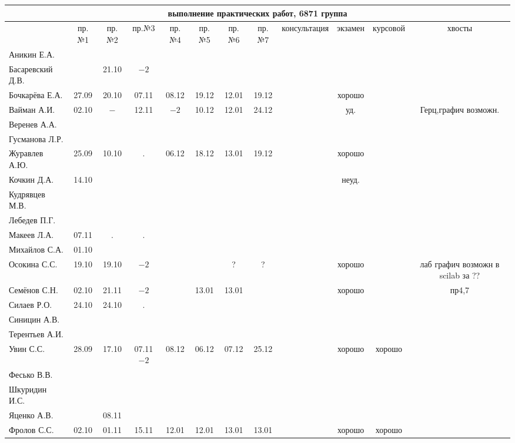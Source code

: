 \documentclass[a4paper,landscape,11pt]{article}
\newcommand*\ok{&{\small \ding{51}}} %
\begin{document}
\begin{tabular}{l|ccccccccccc}
\multicolumn{12}{c}{выполнение практических работ, 6871 группа} \\
\toprule
		        &пр.№1&пр.№2&пр.№3&пр.№4&пр.№5&пр.№6&пр.№7&консультация&экзамен&курсовой&хвосты\\
\midrule
	Аникин Е.А.     &     &     &     &     &     &&&&&\\    
	Басаревский Д.В.&     &21.10& $-2$&     &     &     &     \ok{\small\ding{51}}&&\\
	Бочкарёва Е.А.  &27.09&20.10&07.11&08.12&19.12&12.01&19.12\ok&хорошо&&\\
	Вайман А.И.     &02.10&$-$  &12.11& $-2$&10.12&12.01&24.12\ok&уд.&&Герц,графич возможн.\\
	Веренев А.А.    &     &     &     &     &           &&&&&\\
	Гусманова Л.Р.  &     &     &     &     &     &&&&&\\
	Журавлев А.Ю.   &25.09&10.10&  .  &06.12&18.12&13.01&19.12\ok&хорошо&&\\
	Кочкин Д.А.     &14.10&     &     &     &     &     &     \ok&неуд.&&\\
	Кудрявцев М.В.  &     &     &     &     &     &&&&&\\
	Лебедев П.Г.    &     &     &     &     &     &&&&&\\
	Макеев Л.А.     &07.11&  .  &  .  &     &     &&&&&\\
	Михайлов С.А.   &01.10&     &     &     &     &     &     \ok&&&\\
	Осокина С.С.    &19.10&19.10&$-2$ &     &     &?    &?    \ok{\small\ding{51}}&хорошо&&лаб графич возможн в scilab за ??\\
	Семёнов С.Н.    &02.10&21.11&$-2 $&     &13.01&13.01&     \ok&хорошо&&пр4,7\\
	Силаев Р.О.     &24.10&24.10&  .  &     &     &&&&&\\
	Синицин А.В.    &     &     &     &     &     &&&&&\\
	Терентьев А.И.  &     &     &     &     &     &&&&&\\
	Увин С.С.       &28.09&17.10&07.11$-2  $&08.12&06.12&07.12&25.12\ok&хорошо&хорошо&\\
	Фесько В.В.     &     &     &     &     &     &&&&&\\
	Шкуридин И.С.   &     &     &     &     &     &&&&&\\
	Яценко А.В.     &     &08.11&     &     &     &&&&&\\
	Фролов С.С.     &02.10&01.11&15.11&12.01&12.01&13.01&13.01\ok&хорошо&хорошо&\\
\bottomrule
\end{tabular}
\end{document}
